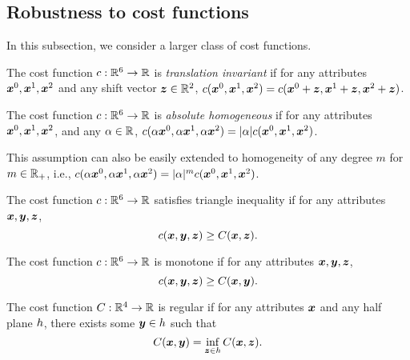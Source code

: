\subsection{Robustness to cost functions}\label{subsec: seq general cost}

In this subsection, we consider a larger class of cost functions. 

\begin{assumption}\label{def: translation invariant}
    The cost function $c : \mathbb{R}^6 \to \mathbb{R}$ is \emph{translation invariant} if for any attributes $\boldsymbol{x}^0, \boldsymbol{x}^1,\boldsymbol{x}^2$ and any shift vector $\boldsymbol{z}\in \mathbb{R}^2$, $c(\boldsymbol{x}^0, \boldsymbol{x}^1,\boldsymbol{x}^2) = c(\boldsymbol{x}^0+\boldsymbol{z}, \boldsymbol{x}^1+\boldsymbol{z},\boldsymbol{x}^2+\boldsymbol{z})$.
\end{assumption}

\begin{assumption}\label{def: absolute homogenous c}
    The cost function $c : \mathbb{R}^6 \to \mathbb{R}$ is \emph{absolute homogeneous} if for any attributes $\boldsymbol{x}^0, \boldsymbol{x}^1,\boldsymbol{x}^2$, and any $\alpha\in \mathbb{R}$, $c(\alpha\boldsymbol{x}^0, \alpha\boldsymbol{x}^1,\alpha\boldsymbol{x}^2) = |\alpha|c(\boldsymbol{x}^0, \boldsymbol{x}^1,\boldsymbol{x}^2)$.
\end{assumption}
This assumption can also be easily extended to homogeneity of any degree $m$ for $m\in \mathbb{R}_+$, i.e., $c(\alpha\boldsymbol{x}^0, \alpha\boldsymbol{x}^1,\alpha\boldsymbol{x}^2) = |\alpha|^m c(\boldsymbol{x}^0, \boldsymbol{x}^1,\boldsymbol{x}^2)$.

\begin{assumption}\label{def: trainagle inequality}
    The cost function $c : \mathbb{R}^6 \to \mathbb{R}$ satisfies triangle inequality if for any attributes $\boldsymbol{x},  \boldsymbol{y}, \boldsymbol{z}$, 
    $$c(\boldsymbol{x}, \boldsymbol{y}, \boldsymbol{z})\geq C(\boldsymbol{x},  \boldsymbol{z}).$$ 
\end{assumption}

\begin{assumption}[monotonicity]\label{def: monotone}
    The cost function $c : \mathbb{R}^6 \to \mathbb{R}$ is monotone if for any attributes $\boldsymbol{x}, \boldsymbol{y}, \boldsymbol{z}$, 
    $$c(\boldsymbol{x}, \boldsymbol{y}, \boldsymbol{z})\geq C(\boldsymbol{x},  \boldsymbol{y}).$$ 
\end{assumption}


\begin{assumption}[regular]\label{def: existence of minimum cost}
    The cost function $C: \mathbb{R}^4 \to \mathbb{R}$ is regular if for any attributes $\boldsymbol{x}$ and any half plane $h$, there exists some $\boldsymbol{y}\in h$ such that 
    $$C(\boldsymbol{x}, \boldsymbol{y})=\inf_{\boldsymbol{z}\in h}C(\boldsymbol{x},\boldsymbol{z}).$$    
\end{assumption}





